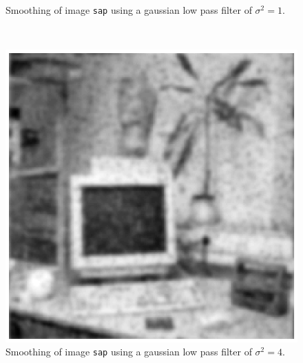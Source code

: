 \begin{minipage}{\linewidth}
\begin{minipage}{0.4\linewidth}
\begin{figure}[H]
      \caption{Smoothing of image \texttt{sap} using a gaussian low pass filter of $\sigma^2 = 1$.}
      \label{fig:Q17_discgaussfft_sap_1}
    \end{figure}
  \end{minipage}
\end{minipage}
\\

\begin{minipage}{\linewidth}
  \begin{minipage}{0.4\linewidth}
    \begin{figure}[H]
      \includegraphics[scale=0.6]{./images/Q17/discgaussfft/sap_4.eps}
      \caption{Smoothing of image \texttt{sap} using a gaussian low pass filter of $\sigma^2 = 4$.}
      \label{fig:Q17_discgaussfft_sap_4}
    \end{figure}
  \end{minipage}
  \hspace{0.05\linewidth}
  \begin{minipage}{0.4\linewidth}
    \begin{figure}[H]

\end{figure}
\end{minipage}
\end{minipage}
